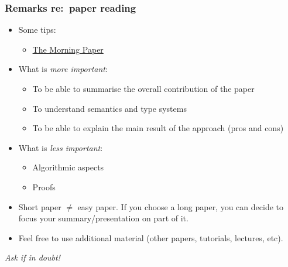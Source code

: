 \begin{frame}
  \frametitle{Remarks re:\ paper reading}
  \begin{itemize}
  \item Some tips:
    \begin{itemize}
    \item \href{https://blog.acolyer.org/2018/01/26/a-practitioners-guide-to-reading-programming-languages-papers/}{The Morning Paper}
    \end{itemize}
  \item What is \emph{more important}:
    \begin{itemize}
    \item To be able to summarise the overall contribution of the paper
    \item To understand semantics and type systems
    \item To be able to explain the main result of the approach (pros and cons)
    \end{itemize}
  \item What is \emph{less important}:
    \begin{itemize}
    \item Algorithmic aspects
    \item Proofs
    \end{itemize}
  \item Short paper $\neq$ easy paper. If you choose a long
    paper, you can decide to focus your summary/presentation on part
    of it.
  \item Feel free to use additional material (other papers, tutorials, lectures, etc).
  \end{itemize}

  \bigskip

  \emph{Ask if in doubt!}
\end{frame}



